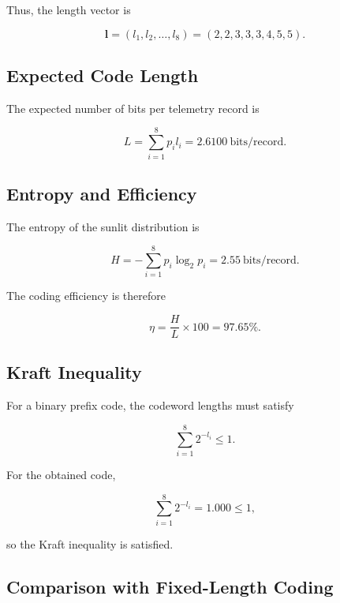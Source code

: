 \documentclass[11pt,a4paper]{article}
\begin{document}
Thus, the length vector is

\begin{equation}
    \mathbf{l} = (l_1,l_2,\ldots,l_8)
    = (2, 2, 3, 3, 3, 4, 5, 5).
\end{equation}

\subsection{Expected Code Length}

The expected number of bits per telemetry record is

\begin{equation}
    L = \sum_{i=1}^{8} p_i l_i
    = \boxed{2.6100\ \text{bits/record}}.
\end{equation}

\subsection{Entropy and Efficiency}

The entropy of the sunlit distribution is

\begin{equation}
    H = -\sum_{i=1}^{8}p_i\log_2 p_i
    = \boxed{2.55\ \text{bits/record}}.
\end{equation}

The coding efficiency is therefore

\begin{equation}
    \eta = \frac{H}{L}\times100
    = \boxed{97.65\%}.
\end{equation}

\subsection{Kraft Inequality}

For a binary prefix code, the codeword lengths must satisfy

\begin{equation}
    \sum_{i=1}^{8}2^{-l_i}\leq1.
\end{equation}

For the obtained code,

\begin{equation}
    \sum_{i=1}^{8}2^{-l_i}
    = 1.000 \leq 1,
\end{equation}

so the Kraft inequality is satisfied.

\subsection{Comparison with Fixed-Length Coding}
\end{document}
